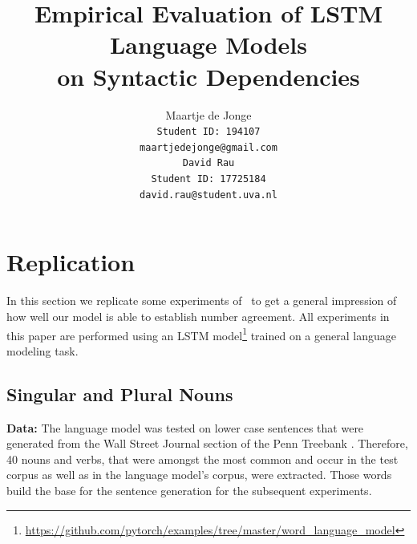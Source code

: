 \documentclass[11pt,a4paper]{article}
\title{Empirical Evaluation of LSTM Language Models \protect\\ \bigskip
on Syntactic Dependencies}
\author{
Maartje de Jonge\\
\tt Student ID: 194107\\
{\tt maartjedejonge@gmail.com} \\\And
David Rau \\
\tt Student ID: 17725184\\
{\tt david.rau@student.uva.nl} \\}
\date{}
\begin{document}
\maketitle














\section{Replication}
\label{replication}

In this section we replicate some experiments of~\citep{Linzen2016} to get a general impression of how well our model is able to establish number agreement.
All experiments in this paper are performed using an LSTM model\footnote{
\url{https://github.com/pytorch/examples/tree/master/word_language_model}
} trained on a general language modeling task.

\subsection{Singular and Plural Nouns}

\textbf{Data:} 
The language model was tested on lower case sentences that were generated from the Wall Street Journal section of the Penn Treebank \citep{Marcus1993}. Therefore, 40 nouns and verbs, that were amongst the most common and occur in the test corpus as well as in the language model's corpus, were extracted. Those words build the base for the sentence generation for the subsequent experiments. 
\end{document}
